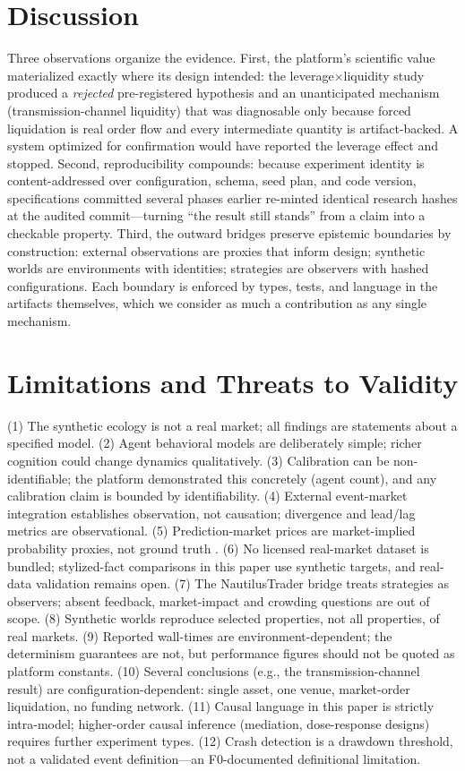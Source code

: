 \documentclass[conference]{IEEEtran}
\begin{document}
\section{Discussion}
\label{sec:discussion}
Three observations organize the evidence. First, the platform's
scientific value materialized exactly where its design intended: the
leverage$\times$liquidity study produced a \emph{rejected}
pre-registered hypothesis and an unanticipated mechanism
(transmission-channel liquidity) that was diagnosable only because
forced liquidation is real order flow and every intermediate quantity
is artifact-backed. A system optimized for confirmation would have
reported the leverage effect and stopped. Second, reproducibility
compounds: because experiment identity is content-addressed over
configuration, schema, seed plan, and code version, specifications
committed several phases earlier re-minted identical research hashes
at the audited commit---turning ``the result still stands'' from a
claim into a checkable property. Third, the outward bridges preserve
epistemic boundaries by construction: external observations are proxies
that inform design; synthetic worlds are environments with identities;
strategies are observers with hashed configurations. Each boundary is
enforced by types, tests, and language in the artifacts themselves,
which we consider as much a contribution as any single mechanism.

\section{Limitations and Threats to Validity}
\label{sec:limits}
(1) The synthetic ecology is not a real market; all findings are
statements about a specified model. (2) Agent behavioral models are
deliberately simple; richer cognition could change dynamics
qualitatively. (3) Calibration can be non-identifiable; the platform
demonstrated this concretely (agent count), and any calibration claim
is bounded by identifiability. (4) External event-market integration
establishes observation, not causation; divergence and lead/lag
metrics are observational. (5) Prediction-market prices are
market-implied probability proxies, not ground truth
\cite{wolfers2004}. (6) No licensed real-market dataset is bundled;
stylized-fact comparisons in this paper use synthetic targets, and
real-data validation remains open. (7) The NautilusTrader bridge
treats strategies as observers; absent feedback, market-impact and
crowding questions are out of scope. (8) Synthetic worlds reproduce
selected properties, not all properties, of real markets. (9)
Reported wall-times are environment-dependent; the determinism
guarantees are not, but performance figures should not be quoted as
platform constants. (10) Several conclusions (e.g., the
transmission-channel result) are configuration-dependent: single
asset, one venue, market-order liquidation, no funding network. (11)
Causal language in this paper is strictly intra-model; higher-order
causal inference (mediation, dose-response designs) requires further
experiment types. (12) Crash detection is a drawdown threshold, not a
validated event definition---an F0-documented definitional limitation.
\end{document}
